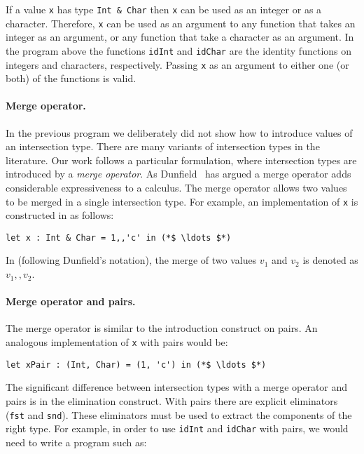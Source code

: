 \noindent If a value \lstinline{x} has type \lstinline{Int & Char} then
\lstinline{x} can be used as an integer or as a character. Therefore,
\lstinline{x} can be used as an argument to any function that takes
an integer as an argument, or any
function that take a character as an argument. In the program above
the functions \lstinline{idInt} and \lstinline{idChar} are the
identity functions on integers and characters, respectively.
Passing \lstinline{x} as an argument to either one (or both) of the
functions is valid.

\paragraph{Merge operator.}
In the previous program we deliberately did not show how to introduce values of
an intersection type. There are many variants of intersection types in the
literature. Our work follows a particular formulation, where intersection types
are introduced by a \emph{merge operator}. As
Dunfield~\cite{dunfield2014elaborating} has argued a merge operator adds
considerable expressiveness to a calculus. The merge operator allows two values
to be merged in a single intersection type. For example, an implementation of
\lstinline{x} is constructed in \name as follows:

\begin{lstlisting}
let x : Int & Char = 1,,'c' in (*$ \ldots $*)
\end{lstlisting}

\noindent In \name (following Dunfield's notation), the
merge of two values $v_1$ and $v_2$ is denoted as $v_1 ,, v_2$.

\paragraph{Merge operator and pairs.}
The merge operator is similar to the introduction construct on pairs.
An analogous implementation of \lstinline{x} with pairs would be:

\begin{lstlisting}
let xPair : (Int, Char) = (1, 'c') in (*$ \ldots $*)
\end{lstlisting}

\noindent The significant difference between intersection types with a
merge operator and pairs is in the elimination construct. With pairs
there are explicit eliminators (\lstinline{fst} and
\lstinline{snd}). These eliminators must be used to extract the
components of the right type. For example, in order to use
\lstinline{idInt} and \lstinline{idChar} with pairs, we would need to
write a program such as:

